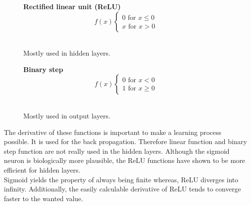 \documentclass[12pt]{article}
\begin{document}
\begin{figure}[H]
\vspace{1cm}
\begin{minipage}[t]{0.5\textwidth}
\begin{center}
\textbf{Rectified linear unit (ReLU)}
\begin{equation}\nonumber
f(x) \left\{\begin{matrix}
0 \text{ for } x \leq 0\\ 
x \text{ for } x >  0
\end{matrix}\right.
\end{equation}
\\
Mostly used in \glspl{hidden layer}.
\end{center}
\end{minipage}
\begin{minipage}[t]{0.5\textwidth}
\begin{center}
\textbf{Binary step}
\begin{equation}\nonumber
f(x) \left\{\begin{matrix}
0 \text{ for } x < 0\\ 
1 \text{ for } x \geq 0
\end{matrix}\right.
\end{equation}
\\
Mostly used in  \glspl{output layer}.
\end{center}
\end{minipage}
\end{figure}
The derivative of these functions is important to make a learning process possible. It is used for the \gls{back propagation}. Therefore \gls{linear function} and \gls{binary step function} are not really used in the \glspl{hidden layer}.
Although the \gls{sigmoid neuron} is biologically more plausible, the \gls{ReLU} functions have shown to be more efficient for \glspl{hidden layer}. \cite{advantages_activation} \\
Sigmoid yields the property of always being finite whereas, \gls{ReLU} diverges into infinity. Additionally, the easily calculable derivative of \gls{ReLU} tends to converge faster to the wanted value. 
\end{document}
